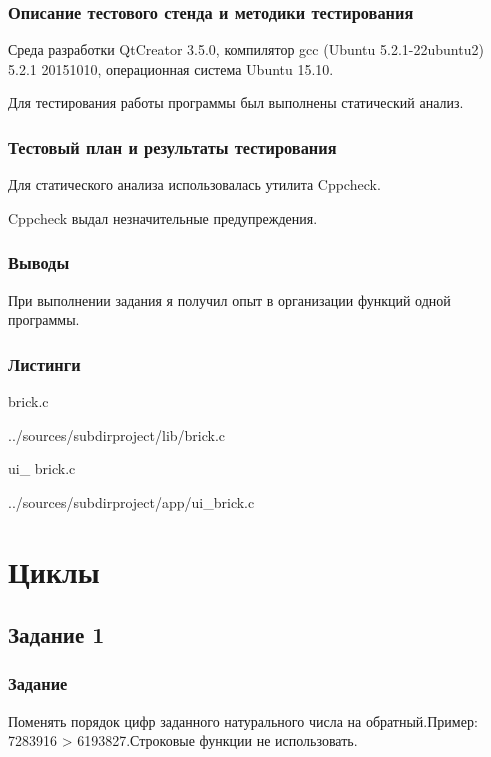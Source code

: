 \documentclass[12pt,a4paper]{report}
\begin{document}
\subsection{Описание тестового стенда и методики тестирования}
Среда разработки QtCreator 3.5.0, компилятор gcc (Ubuntu 5.2.1-22ubuntu2) 5.2.1 20151010, операционная система Ubuntu 15.10.

Для тестирования работы программы был выполнены статический анализ.

\subsection{Тестовый план и результаты тестирования}

		Для статического анализа использовалась утилита Cppcheck.
		
		\vspace{\baselineskip}
		
 Cppcheck выдал незначительные предупреждения.		
\subsection{Выводы}

При выполнении задания я получил опыт в организации функций одной программы.

\subsection*{Листинги}
brick.c

{../sources/subdirproject/lib/brick.c}

\vspace{\baselineskip}

ui\_ brick.c

{../sources/subdirproject/app/ui_brick.c}



\chapter{Циклы}
\section{Задание 1}
\subsection{Задание}

Поменять порядок цифр заданного натурального числа на обратный.Пример: 7283916 > 6193827.Строковые функции не использовать.
\end{document}
